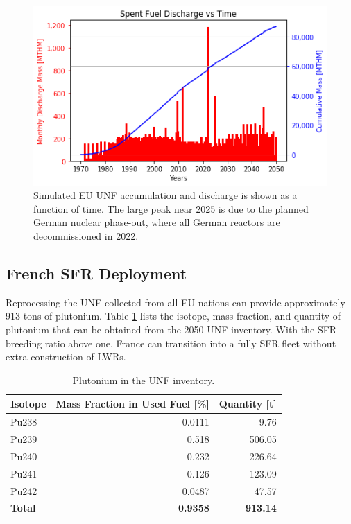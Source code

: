 \begin{figure}[htbp!]
	\begin{center}
			\includegraphics[scale=0.7]{./images/eu_future/snf_discharge.png}
	\end{center}
        \caption{Simulated \gls{EU} \gls{UNF} accumulation and discharge is 
shown as a function of time. The large peak near 2025 is due to the planned German
nuclear phase-out, where all German reactors are decommissioned in 2022.}
	\label{fig:eu_snf}
\end{figure}


\subsection{French \gls{SFR} Deployment}
\FloatBarrier

Reprocessing the \gls{UNF} collected from all EU nations can provide
approximately 913 tons of plutonium. Table \ref{tab:pu} lists the 
isotope, mass fraction, and quantity of plutonium that can be obtained from the 
2050 \gls{UNF} inventory.  With the \gls{SFR} breeding ratio above one, France 
can transition into a fully \gls{SFR} fleet without extra construction of 
\glspl{LWR}. 

\begin{table}[h]
	\centering
	\caption{Plutonium in the \gls{UNF} inventory.}
	\begin{tabular}{lrr}
		\hline
		\textbf{Isotope} & \textbf{Mass Fraction in Used Fuel [\%]} & \textbf{Quantity [t]} \\ \hline
		Pu238 & 0.0111 & 9.76 \\ 
		Pu239 & 0.518 & 506.05 \\ 
		Pu240 & 0.232 & 226.64 \\ 
		Pu241 & 0.126 & 123.09 \\ 
		Pu242 & 0.0487 & 47.57 \\ \hline
		\textbf{Total} & \textbf{0.9358} & \textbf{913.14} \\ \hline
	\end{tabular}
	
	\label{tab:pu}
\end{table}

